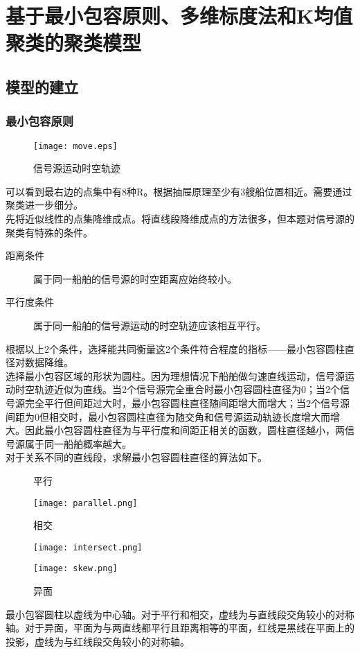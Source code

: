 \clearpage
\section{基于最小包容原则、多维标度法和K均值聚类的聚类模型}
\subsection{模型的建立}
\subsubsection{最小包容原则}
\begin{figure}[htbp]
	\centering
	\caption{信号源运动时空轨迹}\label{信号源运动时空轨迹}
	\texttt{[image: move.eps]}
\end{figure}
\par 可以看到最右边的点集中有8种R。根据抽屉原理至少有3艘船位置相近。需要通过聚类进一步细分。
\\\indent 先将近似线性的点集降维成点。将直线段降维成点的方法很多，但本题对信号源的聚类有特殊的条件。
\begin{description}
	\item[距离条件]属于同一船舶的信号源的时空距离应始终较小。
	\item[平行度条件]属于同一船舶的信号源运动的时空轨迹应该相互平行。
\end{description}
\par 根据以上2个条件，选择能共同衡量这2个条件符合程度的指标——最小包容圆柱直径对数据降维。
\\\indent 选择最小包容区域的形状为圆柱。因为理想情况下船舶做匀速直线运动，信号源运动时空轨迹近似为直线。当2个信号源完全重合时最小包容圆柱直径为0；当2个信号源完全平行但间距过大时，最小包容圆柱直径随间距增大而增大；当2个信号源间距为0但相交时，最小包容圆柱直径为随交角和信号源运动轨迹长度增大而增大。因此最小包容圆柱直径为与平行度和间距正相关的函数，圆柱直径越小，两信号源属于同一船舶概率越大。
\\\indent 对于关系不同的直线段，求解最小包容圆柱直径的算法如下。
\begin{figure}[htbp]
	\centering
	\begin{minipage}[htbp]{4cm}
		\centering
		\caption{平行}
		\texttt{[image: parallel.png]}
	\end{minipage}
	\begin{minipage}[htbp]{4cm}
		\centering
		\caption{相交}
		\texttt{[image: intersect.png]}
	\end{minipage}
	\begin{minipage}[htbp]{5cm}
		\centering
		\caption{异面}
		\texttt{[image: skew.png]}
	\end{minipage}
\end{figure}
\par 最小包容圆柱以虚线为中心轴。对于平行和相交，虚线为与直线段交角较小的对称轴。对于异面，平面为与两直线都平行且距离相等的平面，红线是黑线在平面上的投影，虚线为与红线段交角较小的对称轴。
